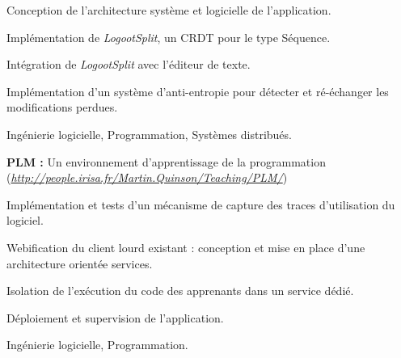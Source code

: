 \begin{cventries}
\begin{cvparagraph}
    \medskip
    \begin{cvitems} %
        \item Conception de l'architecture système et logicielle de l'application.
        \item Implémentation de \emph{LogootSplit}, un CRDT pour le type Séquence.
        \item Intégration de \emph{LogootSplit} avec l'éditeur de texte.
        \item Implémentation d'un système d'anti-entropie pour détecter et ré-échanger les modifications perdues.
    \end{cvitems}

    \medskip
     Ingénierie logicielle, Programmation, Systèmes distribués.
\end{cvparagraph}

\begin{cvparagraph}
    \textbf{PLM :} Un environnement d'apprentissage de la programmation (\href{http://people.irisa.fr/Martin.Quinson/Teaching/PLM/}{\emph{http://people.irisa.fr/Martin.Quinson/Teaching/PLM/}})

    \medskip
    \begin{cvitems} %
        \item Implémentation et tests d'un mécanisme de capture des traces d'utilisation du logiciel.
        \item Webification du client lourd existant : conception et mise en place d'une architecture orientée services.
        \item Isolation de l'exécution du code des apprenants dans un service dédié.
        \item Déploiement et supervision de l'application.
    \end{cvitems}

    \medskip
     Ingénierie logicielle, Programmation.
\end{cvparagraph}

\end{cventries}
